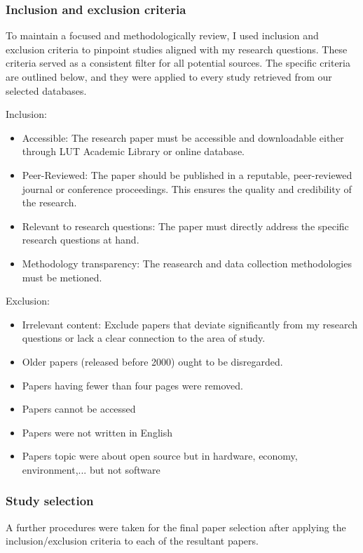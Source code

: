 \subsubsection{Inclusion and exclusion criteria}

To maintain a focused and methodologically review, I used inclusion and exclusion criteria to pinpoint studies aligned with my research questions. These criteria served as a consistent filter for all potential sources. The specific criteria are outlined below, and they were applied to every study retrieved from our selected databases.

Inclusion:
\begin{itemize}
    \item Accessible: The research paper must be accessible and downloadable either through LUT Academic Library or online database.
    \item Peer-Reviewed: The paper should be published in a reputable, peer-reviewed journal or conference proceedings. This ensures the quality and credibility of the research.
    \item Relevant to research questions: The paper must directly address the specific research questions at hand.
    \item Methodology transparency: The reasearch and data collection  methodologies must be metioned.
\end{itemize}

Exclusion:
\begin{itemize}
    \item Irrelevant content: Exclude papers that deviate significantly from my research questions or lack a clear connection to the area of study.
    \item Older papers (released before 2000) ought to be disregarded.
    \item Papers having fewer than four pages were removed.
    \item Papers cannot be accessed
    \item Papers were not written in English
    \item Papers topic were about open source but in hardware, economy, environment,... but not software
\end{itemize}

\subsubsection{Study selection}
A further procedures were taken for the final paper selection after applying the inclusion/exclusion criteria to each of the resultant papers.

